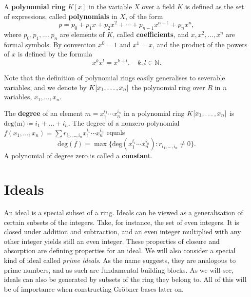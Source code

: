 \documentclass[english,bachelor]{liumaiex}
\begin{document}
\begin{define}
A \textbf{polynomial ring} $K[x]$ in the variable $X$ over a field $K$ is defined as the set of expressions, called \textbf{polynomials} in $X$, of the form
\begin{displaymath}
p = p_0+p_1x+p_2x^2+ \cdots +p_{n-1}x^{n-1}+p_nx^n,
\end{displaymath}
where $p_0, p_1, \dots, p_n$ are elements of $K$, called \textbf{coefficients}, and $x,x^2,\dots, x^n$ are formal symbols. By convention $x^0=1$ and $x^1=x$, and the product of the powers of $x$ is defined by the formula
\begin{displaymath}
x^kx^l = x^{k+l}, \quad k,l \in \mathbb{N}.
\end{displaymath}
\end{define}

Note that the definition of polynomial rings easily generalises to severable variables, and we denote by $K[x_1,\dots, x_n]$ the polynomial ring over $R$ in $n$ variables, $x_1, \dots, x_n$.

\begin{define}
The \textbf{degree} of an element $m=x_1^{i_1} \cdots x_n^{i_n}$ in a polynomial ring $K[x_1,\dots, x_n]$ is $\textrm{deg(m)}\coloneqq i_1+\dots+i_n.$ The degree of a nonzero polynomial $f(x_1,\dots,x_n) = \sum r_{i_1,\dots,i_n}x_1^{i_1}\cdots x_n^{i_n}$ equals 
\begin{displaymath}
\textrm{deg}(f) = \max\{\textrm{deg}(x_1^{i_1} \cdots x_n^{i_n}):r_{i_1,\dots,i_n} \neq 0\}.
\end{displaymath}
A polynomial of degree zero is called a \textbf{constant}.
\end{define}

\section{Ideals}
An ideal is a special subset of a ring. Ideals can be viewed as a generalisation of certain subsets of the integers. Take, for instance, the set of even integers. It is closed under addition and subtraction, and an even integer multiplied with any other integer yields still an even integer. These properties of closure and absorption are defining properties for an ideal. We will also consider a special kind of ideal called \emph{prime ideals}. As the name suggests, they are analogous to prime numbers, and as such are fundamental building blocks. As we will see, ideals can also be generated by subsets of the ring they belong to. All of this will be of importance when constructing Gröbner bases later on.
\end{document}
